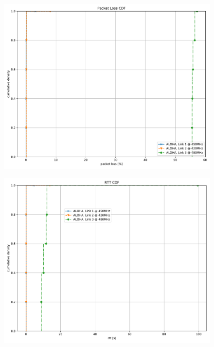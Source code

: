 \documentclass{article}
\begin{document}
\begin{figure}
	\includegraphics[width=\textwidth]{aloha_single/cdf/packet_loss_cdf}
\end{figure}

\begin{figure}
	\includegraphics[width=\textwidth]{aloha_single/cdf/rtt_cdf}
\end{figure}
\end{document}

